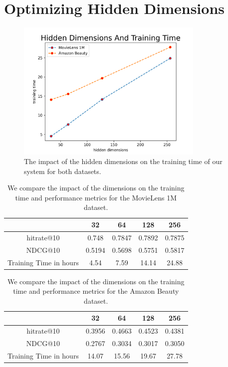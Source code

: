 \section{Optimizing Hidden Dimensions}

\begin{figure}[htbp!]
\centering
\includegraphics[width=0.8\textwidth]{images/plots/time_hidden_dimensions.png}
\caption{The impact of the hidden dimensions on the training time of our system for both datasets.}
\label{fig:time_hidden_dimensions}
\end{figure}

\begin{table}[htbp!]
\centering
 \begin{tabular}{||c c c c c||} 
 \hline
  & 32 & 64 & 128 & 256 \\ [0.5ex] 
 \hline\hline
 hitrate@10 & 0.748 & 0.7847 & 0.7892 & 0.7875  \\ 
 NDCG@10 & 0.5194 & 0.5698 & 0.5751 & 0.5817   \\
 \hline
 Training Time in hours & 4.54 & 7.59 & 14.14 & 24.88  \\
 \hline
\end{tabular}
\caption{We compare the impact of the dimensions on the training time and performance metrics for the MovieLens 1M dataset.}
\label{tab:performance_dimensions_movielens}
\end{table}

\begin{table}[htbp!]
\centering
 \begin{tabular}{||c c c c c||} 
 \hline
  & 32 & 64 & 128 & 256 \\ [0.5ex] 
 \hline\hline
 hitrate@10 & 0.3956 & 0.4663 & 0.4523 & 0.4381  \\ 
 NDCG@10 & 0.2767 & 0.3034 & 0.3017 & 0.3050     \\
 \hline
 Training Time in hours & 14.07 & 15.56 & 19.67 & 27.78  \\
 \hline
\end{tabular}
\caption{We compare the impact of the dimensions on the training time and performance metrics for the Amazon Beauty dataset.}
\label{tab:performance_dimensions_beauty}
\end{table}

